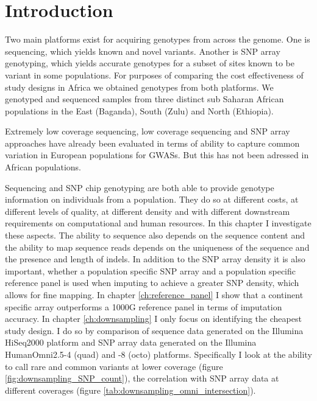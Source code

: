 \section{Introduction}
\label{sec:downsampling_introduction}

Two main platforms exist for acquiring genotypes from across the genome. One is sequencing, which yields known and novel variants. Another is SNP array genotyping, which yields accurate genotypes for a subset of sites known to be variant in some populations. For purposes of comparing the cost effectiveness of study designs in Africa we obtained genotypes from both platforms. We genotyped and sequenced samples from three distinct sub Saharan African populations in the East (Baganda), South (Zulu) and North (Ethiopia).

Extremely low coverage sequencing, low coverage sequencing and SNP array approaches have already been evaluated in terms of ability to capture common variation in European populations for \glspl{GWAS}.\cite{Pasaniuc2012}\cite{10.1371/journal.pcbi.1002604} But this has not been adressed in African populations.

Sequencing and \gls{SNP} chip genotyping are both able to provide genotype information on individuals from a population. They do so at different costs, at different levels of quality, at different density and with different downstream requirements on computational and human resources. In this chapter I investigate these aspects. The ability to sequence also depends on the sequence content and the ability to map sequence reads depends on the uniqueness of the sequence and the presence and length of indels. In addition to the \gls{SNP} array density it is also important, whether a population specific \gls{SNP} array and a population specific reference panel is used when imputing to achieve a greater SNP density, which allows for fine mapping. In chapter \ref{ch:reference_panel} I show that a continent specific array outperforms a 1000G reference panel in terms of imputation accuracy. In chapter \ref{ch:downsampling} I only focus on identifying the cheapest study design. I do so by comparison of sequence data generated on the Illumina HiSeq2000 platform and SNP array data generated on the Illumina HumanOmni2.5-4 (quad) and -8 (octo) platforms. Specifically I look at the ability to call rare and common variants at lower coverage (figure \ref{fig:downsampling_SNP_count}), the correlation with SNP array data at different coverages (figure \ref{tab:downsampling_omni_intersection}).

